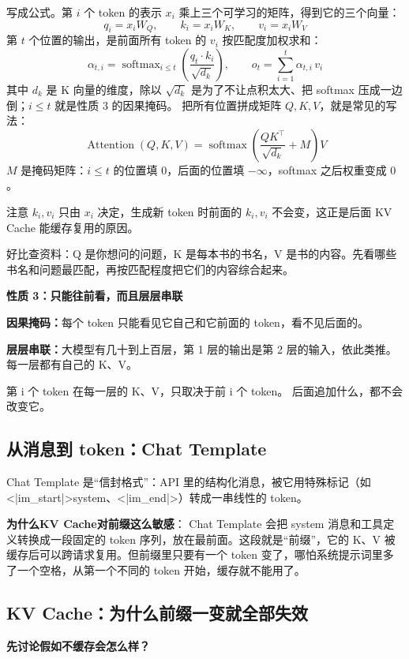 写成公式。第 $i$ 个 token 的表示 $x_i$ 乘上三个可学习的矩阵，得到它的三个向量：
\[
  q_i = x_i W_Q, \qquad k_i = x_i W_K, \qquad v_i = x_i W_V
\]
第 $t$ 个位置的输出，是前面所有 token 的 $v_i$ 按匹配度加权求和：
\[
  \alpha_{t,i} = \operatorname{softmax}_{i\le t}\!\left(\frac{q_t \cdot k_i}{\sqrt{d_k}}\right),
  \qquad
  o_t = \sum_{i=1}^{t} \alpha_{t,i}\, v_i
\]
其中 $d_k$ 是 K 向量的维度，除以 $\sqrt{d_k}$ 是为了不让点积太大、把 softmax 压成一边倒；$i\le t$ 就是性质 3 的因果掩码。
把所有位置拼成矩阵 $Q, K, V$，就是常见的写法：
\[
  \operatorname{Attention}(Q,K,V) = \operatorname{softmax}\!\left(\frac{QK^{\top}}{\sqrt{d_k}} + M\right) V
\]
$M$ 是掩码矩阵：$i\le t$ 的位置填 $0$，后面的位置填 $-\infty$，softmax 之后权重变成 $0$。

注意 $k_i, v_i$ 只由 $x_i$ 决定，生成新 token 时前面的 $k_i, v_i$ 不会变，这正是后面 KV Cache 能缓存复用的原因。

好比查资料：Q 是你想问的问题，K 是每本书的书名，V 是书的内容。先看哪些书名和问题最匹配，再按匹配程度把它们的内容综合起来。

\medskip
\noindent\textbf{性质 3：只能往前看，而且层层串联}

\textbf{因果掩码：}每个 token 只能看见它自己和它前面的 token，看不见后面的。

\textbf{层层串联：}大模型有几十到上百层，第 1 层的输出是第 2 层的输入，依此类推。每一层都有自己的 K、V。

\begin{tcolorbox}[colback=second!5, colframe=second, title=结论]
  第 i 个 token 在每一层的 K、V，只取决于前 i 个 token。 后面追加什么，都不会改变它。
\end{tcolorbox}
\subsection{从消息到 token：Chat Template}
Chat Template 是“信封格式”：API 里的结构化消息，被它用特殊标记（如 <|im\_start|>system、<|im\_end|>）转成一串线性的 token。

\textbf{为什么KV Cache对前缀这么敏感}：
Chat Template 会把 system 消息和工具定义转换成一段固定的 token 序列，放在最前面。这段就是“前缀”，它的 K、V 被缓存后可以跨请求复用。但前缀里只要有一个 token 变了，哪怕系统提示词里多了一个空格，从第一个不同的 token 开始，缓存就不能用了。
\subsection{KV Cache：为什么前缀一变就全部失效}
\textbf{先讨论假如不缓存会怎么样？}

